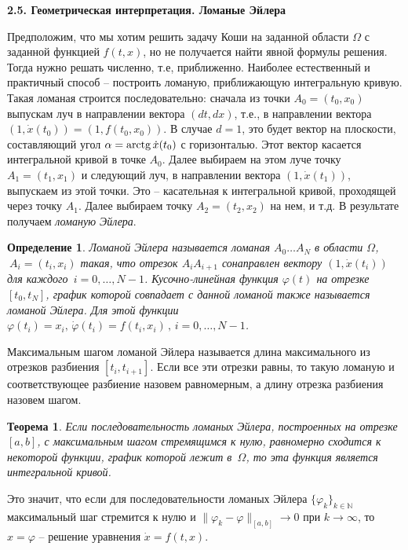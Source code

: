 \documentclass[12pt,a4paper]{article}
\newtheorem{theorem}{Теорема}
\newtheorem{defi}{Определение}
\newcommand{\n}{{\mathbb N}}
\begin{document}
\medskip
\begin{center}
\textbf{2.5. Геометрическая интерпретация. Ломаные Эйлера}
\end{center}
\medskip

Предположим, что мы хотим решить задачу Коши на заданной области $\Omega$ с заданной функцией
$f(t, x)$, но не получается найти
явной формулы решения. Тогда нужно решать численно, т.е, приближенно. Наиболее естественный и практичный способ --
построить ломаную, приближающую интегральную кривую. Такая ломаная строится последовательно:
сначала из точки $A_0 = (t_0, x_0)$ выпускам луч в направлении вектора $(d t , d x)$, т.е., в направлении вектора
$(1, \dot x(t_0)) = (1, f(t_0, x_0))$. В случае $d=1$, это будет вектор на плоскости, составляющий угол
 $\alpha = {\rm arctg}\, \dot x(t_0)$ с горизонталью. Этот вектор касается интегральной кривой в точке $A_0$.
 Далее выбираем на этом луче точку $A_1 = (t_1, x_1)$ и следующий луч, в направлении вектора
 $(1, \dot x(t_1))$, выпускаем из этой точки. Это -- касательная к интегральной кривой, проходящей через точку
 $A_1$. Далее выбираем точку $A_2=  (t_2, x_2)$ на нем, и т.д. В результате получаем {\em ломаную Эйлера}.
 \begin{defi}\label{d.euler}
 Ломаной Эйлера называется ломаная $A_0 \ldots A_N$ в области $\Omega$, $\ A_i = (t_i, x_i)$
 такая, что отрезок $A_iA_{i+1}$ сонаправлен вектору $(1, \dot x(t_i))$ для каждого $\, i = 0, \ldots , N-1$.
 Кусочно-линейная функция $\varphi(t)$ на отрезке $[t_0, t_N]$, график которой совпадает с данной ломаной также называется ломаной Эйлера.  Для этой функции $\varphi(t_i) = x_i, \, \dot \varphi(t_i) = f(t_i, x_i)\, , \, i = 0, \ldots , N-1$.
 \end{defi}
Максимальным шагом ломаной Эйлера называется длина максимального из отрезков разбиения $[t_i, t_{i+1}]$.
Если все эти отрезки равны, то такую ломаную и соответствующее  разбиение назовем равномерным, а длину отрезка разбиения назовем шагом.
\begin{theorem}\label{th.euler}
Если последовательность ломаных Эйлера, построенных на отрезке $[a, b]$, с максимальным шагом стремящимся к нулю,
равномерно сходится к некоторой функции, график которой лежит в~$\Omega$, то эта функция является интегральной кривой.
\end{theorem}
Это значит, что если для последовательности ломаных Эйлера $\{\varphi_k\}_{k \in \n}$ максимальный шаг стремится к нулю
и $\|\varphi_k - \varphi\|_{[a, b]}\to 0$ при $k \to \infty$, то $x = \varphi$ -- решение уравнения $\dot x = f(t, x)$.
\end{document}
